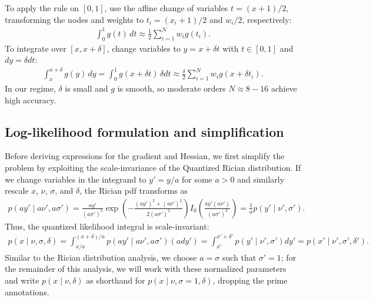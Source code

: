 \documentclass{article}
\begin{document}
To apply the rule on $[0,1]$, use the affine change of variables $t = (x+1)/2$, transforming the nodes and weights to $t_i = (x_i+1)/2$ and $w_i/2$, respectively:
%
\begin{align}
  \int_{0}^{1} g(t) \, dt \approx \frac{1}{2} \sum_{i=1}^{N} w_i g(t_i).
\end{align}
%
To integrate over $[x, x+\delta]$, change variables to $y = x + \delta t$ with $t\in[0,1]$ and $dy = \delta dt$:
%
\begin{align}
  \int_{x}^{x+\delta} g(y) \, dy = \int_{0}^{1} g(x + \delta t) \, \delta dt
  \approx \frac{\delta}{2} \sum_{i=1}^{N} w_i g(x + \delta t_i).
\end{align}
%
In our regime, $\delta$ is small and $g$ is smooth, so moderate orders $N \approx 8\!-\!16$ achieve high accuracy.

\subsection{Log-likelihood formulation and simplification}

Before deriving expressions for the gradient and Hessian, we first simplify the problem by exploiting the scale-invariance of the Quantized Rician distribution.
If we change variables in the integrand to $y' = y / a$ for some $a > 0$ and similarly rescale $x$, $\nu$, $\sigma$, and $\delta$, the Rician pdf transforms as
%
\begin{align}
  p(a y' \mid a \nu', a \sigma')
  = \frac{a y'}{(a \sigma')^2} \exp\left(-\frac{(a y')^2+(a \nu')^2}{2(a \sigma')^2}\right) I_0\left(\frac{a y' (a \nu')}{(a \sigma')^2}\right)
  = \frac{1}{a} p(y' \mid \nu', \sigma').
\end{align}
%
Thus, the quantized likelihood integral is scale-invariant:
%
\begin{align}
  p(x \mid \nu, \sigma, \delta)
  = \int_{x/a}^{(x+\delta)/a} p(a y' \mid a\nu', a\sigma') (a dy') = \int_{x'}^{x'+\delta'} p(y' \mid \nu', \sigma') dy'
  = p(x' \mid \nu', \sigma', \delta').
\end{align}
%
Similar to the Rician distribution analysis, we choose $a = \sigma$ such that $\sigma'=1$;
for the remainder of this analysis, we will work with these normalized parameters and write $p(x \mid \nu, \delta)$ as shorthand for $p(x \mid \nu, \sigma=1, \delta)$, dropping the prime annotations.
\end{document}
